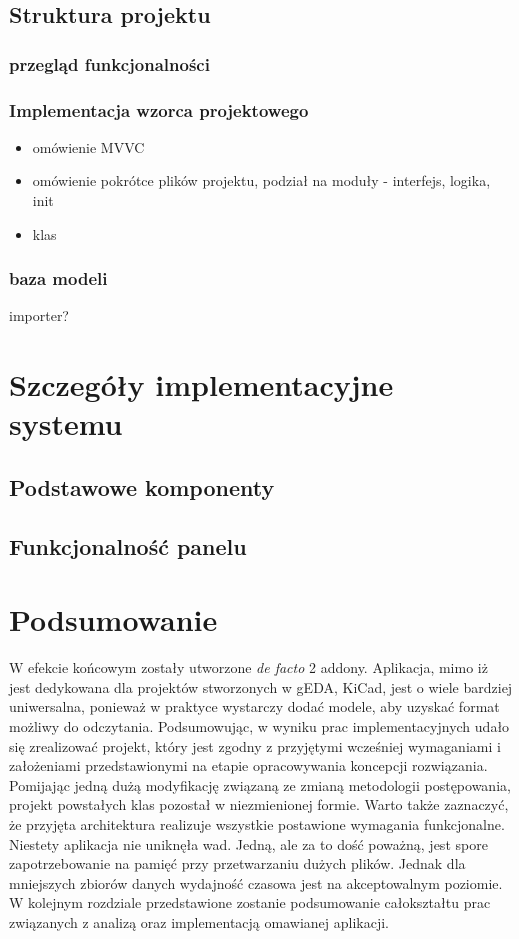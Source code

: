 \documentclass[brudnopis]{xmgr}
\begin{document}
\section {Struktura projektu}
\subsection{przegląd funkcjonalności}
\subsection{Implementacja wzorca projektowego} \label{mvc}
\begin{itemize}
\item omówienie MVVC
\item omówienie pokrótce plików projektu, podział na moduły - interfejs, logika, init
\item klas
\end{itemize}
\subsection{baza modeli} \label{bazamodeli}
importer?




\chapter{Szczegóły implementacyjne systemu}
\section{Podstawowe komponenty}
\section{Funkcjonalność panelu}

\chapter{Podsumowanie}

W efekcie końcowym zostały utworzone \emph{de facto} 2 addony.
Aplikacja,  mimo  iż  jest  dedykowana  dla  projektów stworzonych w gEDA, KiCad,  jest  o  wiele  bardziej uniwersalna, ponieważ w praktyce wystarczy dodać modele, aby uzyskać format możliwy do odczytania. Podsumowując,  w  wyniku  prac  implementacyjnych  udało  się  zrealizować projekt,  który  jest  zgodny  z  przyjętymi  wcześniej  wymaganiami  i  założeniami przedstawionymi  na  etapie  opracowywania  koncepcji  rozwiązania.  Pomijając  jedną dużą modyfikację związaną ze zmianą metodologii postępowania, projekt powstałych klas pozostał w niezmienionej formie. Warto także zaznaczyć, że przyjęta architektura realizuje   wszystkie   postawione   wymagania   funkcjonalne.   Niestety   aplikacja   nie uniknęła wad. Jedną, ale za to dość poważną, jest spore zapotrzebowanie na pamięć przy przetwarzaniu dużych plików. Jednak dla mniejszych zbiorów danych wydajność czasowa jest na akceptowalnym poziomie. W  kolejnym  rozdziale  przedstawione  zostanie  podsumowanie całokształtu prac związanych z analizą oraz implementacją omawianej aplikacji.
\end{document}
